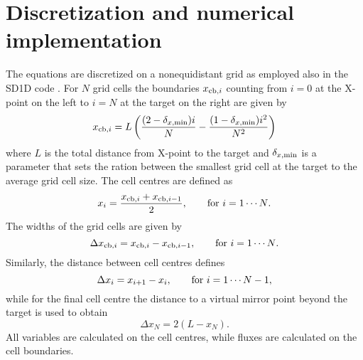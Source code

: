 \documentclass[amsmath,amssymb,a4]{revtex4-2}
\begin{document}
\section{Discretization and numerical implementation}\label{numerics}

The equations are discretized on a nonequidistant grid as employed also in the SD1D code \cite{SD1D}. For  $N$ grid cells the boundaries $x_{{\rm cb},i}$ counting from $i = 0$ at the X-point on the left to $i =N$ at the target on the right are given by \cite{SD1D}
\begin{equation}\label{cell_boundaries}
   x_{{\rm cb},i} = L \left( {(2 - \delta_{x,{\rm min}}) i \over N} - {(1 - \delta_{x,{\rm min}}) i^2 \over N^2} \right)
\end{equation}
where $L$ is the total distance from X-point to the target and $\delta_{x,{\rm min}}$ is a parameter that sets the ration between the smallest grid cell at the target to the average grid cell size. The cell centres are defined as
\begin{equation}\label{cell_centres}
    x_i = {x_{{\rm cb},i} + x_{{\rm cb},i-1} \over 2}, \quad\quad\hbox{for $i = 1 \cdots N$}.
\end{equation}
The widths of the grid cells are given by
\begin{equation}\label{cell_width}
    \Delta x_{{\rm cb},i} = x_{{\rm cb},i} - x_{{\rm cb},i-1}, \quad\quad\hbox{for $i = 1 \cdots N$}.
\end{equation}
Similarly, the distance between cell centres defines
\begin{equation}\label{deltax}
    \Delta x_i = x_{i+1} - x_{i}, \quad\quad\hbox{for $i = 1 \cdots N-1$},
\end{equation}
while for the final cell centre the distance to a virtual mirror point beyond the target is used to obtain
\begin{equation}
    \Delta x_N = 2 ( L - x_N ).
\end{equation}
All variables are calculated on the cell centres, while fluxes are calculated on the cell boundaries.
\end{document}
